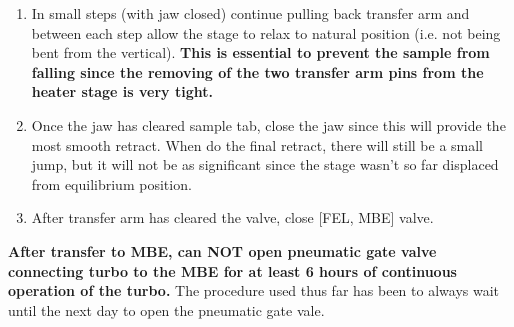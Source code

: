 \begin{enumerate}
	\item In small steps (with jaw closed) continue pulling back transfer arm and between each step allow the stage to relax to natural position (i.e. not being bent from the vertical). \textbf {This is essential to prevent the sample from falling since the removing of the two transfer arm pins from the heater stage is very tight.} 
	\item Once the jaw has cleared sample tab, close the jaw since this will provide the most smooth retract. When do the final retract, there will still be a small jump, but it will not be as significant since the stage wasn't so far displaced from equilibrium position.	
	\item After transfer arm has cleared the valve, close [FEL, MBE] valve.
\end{enumerate}
\textbf{After transfer to MBE, can NOT open pneumatic gate valve connecting turbo to the  MBE for at least 6 hours of continuous operation of the turbo.} The procedure used thus far has been to always wait until the next day to open the pneumatic gate vale.

